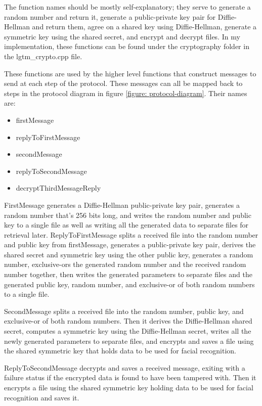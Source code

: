 \documentclass[12pt]{report}
\begin{document}
The function names should be mostly self-explanatory; they serve to generate a random number and return it, generate a public-private key pair for Diffie-Hellman and return them, agree on a shared key using Diffie-Hellman, generate a symmetric key using the shared secret, and encrypt and decrypt files. In my implementation, these functions can be found under the cryptography folder in the lgtm\_crypto.cpp file. \par

These functions are used by the higher level functions that construct messages to send at each step of the protocol. These messages can all be mapped back to steps in the protocol diagram in figure \ref{figure: protocol-diagram}. Their names are: 

\begin{itemize}
    \item firstMessage
    \item replyToFirstMessage
    \item secondMessage
    \item replyToSecondMessage
    \item decryptThirdMessageReply
\end{itemize}

FirstMessage generates a Diffie-Hellman public-private key pair, generates a random number that's 256 bits long, and writes the random number and public key to a single file as well as writing all the generated data to separate files for retrieval later. ReplyToFirstMessage splits a received file into the random number and public key from firstMessage, generates a public-private key pair, derives the shared secret and symmetric key using the other public key, generates a random number, exclusive-ors the generated random number and the received random number together, then writes the generated parameters to separate files and the generated public key, random number, and exclusive-or of both random numbers to a single file. \par

SecondMessage splits a received file into the random number, public key, and exclusive-or of both random numbers. Then it derives the Diffie-Hellman shared secret, computes a symmetric key using the Diffie-Hellman secret, writes all the newly generated parameters to separate files, and encrypts and saves a file using the shared symmetric key that holds data to be used for facial recognition. \par

ReplyToSecondMessage decrypts and saves a received message, exiting with a failure status if the encrypted data is found to have been tampered with. Then it encrypts a file using the shared symmetric key holding data to be used for facial recognition and saves it. \par
\end{document}
